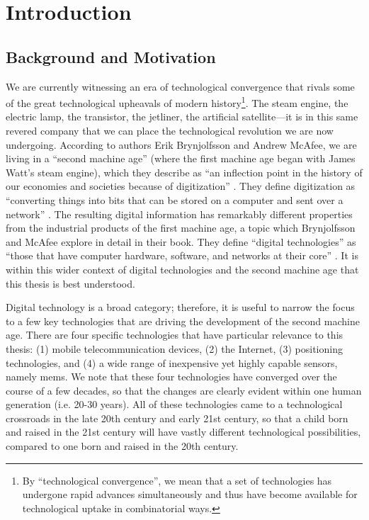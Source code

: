 \chapter{Introduction}
\label{ch:intro}

\section{Background and Motivation}
\label{sec:motivation}

We are currently witnessing an era of technological convergence that rivals some of the great technological upheavals of modern history\footnote{By ``technological convergence'', we mean that a set of technologies has undergone rapid advances simultaneously and thus have become available for technological uptake in combinatorial ways.}. The steam engine, the electric lamp, the transistor, the jetliner, the artificial satellite---it is in this same revered company that we can place the technological revolution we are now undergoing. According to authors Erik Brynjolfsson and Andrew McAfee, we are living in a ``second machine age'' (where the first machine age began with James Watt's steam engine), which they describe as ``an inflection point in the history of our economies and societies because of digitization'' \cite[p. 11]{brynjolfsson_2014}. They define digitization as ``converting things into bits that can be stored on a computer and sent over a network'' \cite[p. 10]{brynjolfsson_2014}. The resulting digital information has remarkably different properties from the industrial products of the first machine age, a topic which Brynjolfsson and McAfee explore in detail in their book. They define ``digital technologies'' as ``those that have computer hardware, software, and networks at their core'' \cite[p. 9]{brynjolfsson_2014}. It is within this wider context of digital technologies and the second machine age that this thesis is best understood.

Digital technology is a broad category; therefore, it is useful to narrow the focus to a few key technologies that are driving the development of the second machine age. There are four specific technologies that have particular relevance to this thesis: (1) mobile telecommunication devices, (2) the Internet, (3) positioning technologies, and (4) a wide range of inexpensive yet highly capable sensors, namely \gls{mems}. We note that these four technologies have converged over the course of a few decades, so that the changes are clearly evident within one human generation (i.e. 20-30 years). All of these technologies came to a technological crossroads in the late 20th century and early 21st century, so that a child born and raised in the 21st century will have vastly different technological possibilities, compared to one born and raised in the 20th century.

